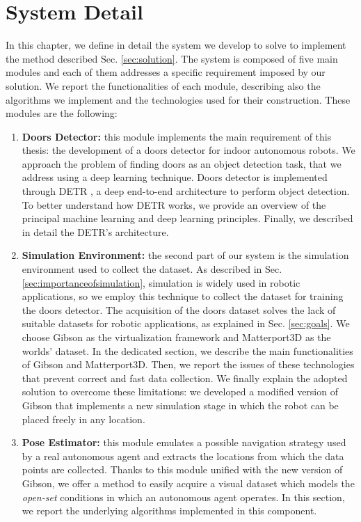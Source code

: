 \chapter{System Detail}
\label{sec:chapter4}
In this chapter, we define in detail the system we develop to solve to implement the method described Sec. \ref{sec:solution}. The system is composed of five main modules and each of them addresses a specific requirement imposed by our solution. We report the functionalities of each module, describing also the algorithms we implement and the technologies used for their construction. These modules are the following:

\begin{enumerate}
	\item \textbf{Doors Detector:} this module implements the main requirement of this thesis: the development of a doors detector for indoor autonomous robots. We approach the problem of finding doors as an object detection task, that we address using a deep learning technique. Doors detector is implemented through DETR \cite{detr}, a deep end-to-end architecture to perform object detection. To better understand how DETR works, we provide an overview of the principal machine learning and deep learning principles. Finally, we described in detail the DETR's architecture. 
	\item \textbf{Simulation Environment:} the second part of our system is the simulation environment used to collect the dataset. As described in Sec. \ref{sec:importanceofsimulation}, simulation is widely used in robotic applications, so we employ this technique to collect the dataset for training the doors detector. The acquisition of the doors dataset solves the lack of suitable datasets for robotic applications, as explained in Sec. \ref{sec:goals}. We choose Gibson \cite{gibson} as the virtualization framework and Matterport3D \cite{matterport} as the worlds' dataset. In the dedicated section, we describe the main functionalities of Gibson and Matterport3D. Then, we report the issues of these technologies that prevent correct and fast data collection. We finally explain the adopted solution to overcome these limitations: we developed a modified version of Gibson that implements a new simulation stage in which the robot can be placed freely in any location.
	\item \textbf{Pose Estimator:} this module emulates a possible navigation strategy used by a real autonomous agent and extracts  the locations from which the data points are collected. Thanks to this module unified with the new version of Gibson, we offer a method to easily acquire a visual dataset which models the \textit{open-set} conditions in which an autonomous agent operates. In this section, we report the underlying algorithms implemented in this component.

\end{enumerate}
